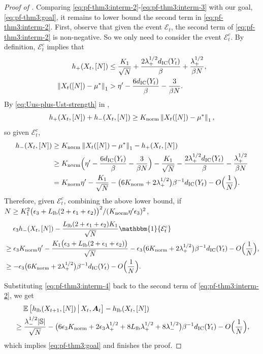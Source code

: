 \documentclass[11pt,letterpaper]{article}
\theoremstyle{plain}
\theoremstyle{definition}
\theoremstyle{remark}
\newcommand{\norm}[1]{\left\lVert#1\right\rVert}
\newcommand{\E}[1]{\mathbb{E}\left[#1\right]}
\newcommand{\givenbig}{\,\big|\,}
\newcommand{\indibrac}[1]{\mathbbm{1}\!\left\{#1\right\}}
\newcommand{\ve}[1]{\bm{#1}}
\newcommand{\veA}{\ve{A}}
\newcommand{\sspa}{\mathbb{S}}
\newcommand{\statdist}{\mu^*}
\newcommand{\disy}{d_{\textup{IC}}}
\newcommand{\gapus}{\epsilon_1} %
\newcommand{\gapusmax}{\epsilon_2}
\newcommand{\gapst}{\epsilon_3}
\newcommand{\radiusus}{\eta'}
\newcommand{\subus}{+}%
\newcommand{\subst}{-}%
\newcommand{\hus}{h_{\subus}}
\newcommand{\hst}{h_{\subst}}
\newcommand{\lamus}{\lambda_{\subus}}
\newcommand{\lamst}{\lambda_{\subst}}
\newcommand{\Knorm}{K_{\textup{norm}}}
\newcommand{\goodevent}{\mathcal{E}}
\newcommand{\hlb}{h_{\textup{lb}}}
\newcommand{\ratiolb}{L_{\textup{lb}}}
\begin{document}
\begin{proof}[Proof of ]
    Comparing \eqref{eq:pf-thm3:interm-2}-\eqref{eq:pf-thm3:interm-3} with our goal, \eqref{eq:pf-thm3:goal}, it remains to lower bound the second term in \eqref{eq:pf-thm3:interm-2}. 
    First, observe that given the event $\goodevent_t$, the second term of \eqref{eq:pf-thm3:interm-2} is non-negative. So we only need to consider the event $\goodevent_t^c$. 
    By definition, $\goodevent_t^c$ implies that 
    \begin{align*}
        \hus(X_t, [N]) &\leq \frac{K_1}{\sqrt{N}} + \frac{2\lamus^{1/2} \disy(Y_t)}{\beta} + \frac{\lamus^{1/2}}{\beta N}, \\
        \norm{X_t([N]) - \statdist}_1 &> \radiusus -  \frac{6\disy(Y_t)}{\beta} - \frac{3}{\beta N}.
    \end{align*}
    By \eqref{eq:Uus-plus-Ust-strength} in , 
    \[
        \hus(X_t, [N]) + \hst(X_t, [N]) \geq \Knorm \norm{X_t([N]) - \statdist}_1,
    \]
    so given $\goodevent_t^c$, 
    \begin{align}
        \nonumber
        \hst(X_t, [N]) 
        &\geq \Knorm \norm{X_t([N]) - \statdist}_1 - \hus(X_t, [N]) \\
        \nonumber
        &\geq \Knorm\Big(\radiusus -  \frac{6\disy(Y_t)}{\beta} - \frac{3}{\beta N}\Big) -  \frac{K_1}{\sqrt{N}} - \frac{2\lamus^{1/2} \disy(Y_t)}{\beta} - \frac{\lamus^{1/2}}{\beta N} \\
        \nonumber
        &= \Knorm \radiusus - \frac{K_1}{\sqrt{N}} - \big(6\Knorm + 2\lamus^{1/2}\big)\beta^{-1} \disy(Y_t) - O\Big(\frac{1}{N}\Big).
    \end{align}
    Therefore, given $\goodevent_t^c$, combining the above lower bound, if $N \geq K_1^2 \big(\gapst+\ratiolb(2+\gapus+\gapusmax)\big)^2 / (\Knorm\radiusus\gapst)^2$, 
    \begin{align}
        \nonumber
        &\mspace{23mu} \gapst \hst(X_t, [N])  - \frac{\ratiolb(2+\gapus+\gapusmax)K_1}{\sqrt{N}} \indibrac{\goodevent_t^c} \\
        \nonumber
        &\geq \gapst \Knorm \radiusus  - \frac{K_1\big(\gapst + \ratiolb(2+\gapus+\gapusmax)\big)}{\sqrt{N}} - \gapst\big( 6\Knorm + 2\lamus^{1/2} \big) \beta^{-1} \disy(Y_t) - O\Big(\frac{1}{N}\Big), \\
        \label{eq:pf-thm3:interm-4}
        &\geq  - \gapst \big( 6\Knorm + 2\lamus^{1/2} \big) \beta^{-1} \disy(Y_t) - O\Big(\frac{1}{N}\Big).
    \end{align}

    Substituting \eqref{eq:pf-thm3:interm-4} back to the second term of  \eqref{eq:pf-thm3:interm-2}, we get 
    \begin{align}
        \nonumber
        &\mspace{23mu} \E{\hlb(X_{t+1}, [N]) \givenbig X_t, \veA_t} - \hlb(X_{t}, [N]) \\
        \nonumber
        &\geq \frac{\lamst^{1/2}|\sspa|}{\sqrt{N}} - \big(6\gapst \Knorm + 2\gapst\lamus^{1/2} + 8\ratiolb \lamus^{1/2} + 8\lamst^{1/2} \big) \beta^{-1} \disy(Y_t) - O\Big(\frac{1}{N}\Big),
    \end{align}
    which implies \eqref{eq:pf-thm3:goal} and finishes the proof. 
\end{proof}
\end{document}
